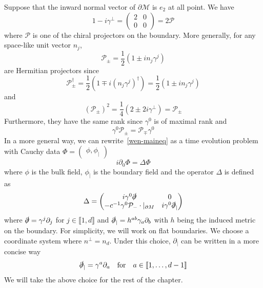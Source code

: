 Suppose that the inward normal vector of $\partial \mathcal{M}$ is $e_2$ at all point.
We have
\begin{equation*}
1 - i\gamma^\bot = 
\begin{pmatrix} 2 & 0 \\ 0 & 0\end{pmatrix} = 2 \mathcal{P}
\end{equation*}
where $\mathcal{P}$ is one of the chiral projectors on the boundary. 
More generally, for any space-like unit vector $n_j$,
\begin{equation*}
\mathcal{P}_\pm = \frac{1}{2}(1 \pm i n_j\gamma^j) 
\end{equation*}
are Hermitian projectors since 
\begin{equation*}
\mathcal{P}_\pm^\dagger = 
\frac{1}{2}(1 \mp i (n_j \gamma^j)^\dagger)=
\frac{1}{2}(1 \pm i n_j \gamma^j)
\end{equation*}
and
\begin{equation*}
(\mathcal{P}_\pm)^{2} = \frac{1}{4}(2\pm 2i \gamma^\bot) = \mathcal{P}_\pm
\end{equation*}
Furthermore, they have the same rank since $\gamma^0$ is of maximal rank and
\begin{equation*}
\gamma^0\mathcal{P}_\pm = \mathcal{P}_\mp\gamma^0
\end{equation*}
In a more general way, 
we can rewrite~\cref{wen-maineq} as a time evolution problem with Cauchy data
$\Phi = \begin{pmatrix}
\phi, \phi_|
\end{pmatrix}$
\begin{equation*}
i\partial_0 \Phi = \Delta \Phi
\end{equation*}
where $\phi$ is the bulk field, $\phi_|$ is the boundary field and the operator $\Delta$ is defined as
\begin{equation}\label{wen-hamiltonian}
\Delta = \begin{pmatrix}
i \gamma^0 \slashed{\partial}  & 0 \\
-c^{-1} \gamma^0 \mathcal{P}_- \cdot \vert_{\partial M}&  i\gamma^0 \slashed{\partial}_|
\end{pmatrix}
\end{equation}
where $\slashed{\partial} = \gamma^j\partial_j$ for
$j \in \llbracket 1 , d \rrbracket$ and $\slashed{\partial}_| = h^{ab} \gamma_{a} \partial_{b}$ with $h$ being the induced metric on the boundary.
For simplicity, we will work on flat boundaries.
We choose a coordinate system where $n^\perp = n_d$.
Under this choice,
$\partial_|$ can be written in a more concise way
\begin{equation*}
\slashed \partial_| = \gamma^a\partial_a \quad\mathrm{for}\quad 
a \in \llbracket 1, \ldots, d-1 \rrbracket
\end{equation*}
We will take the above choice for the rest of the chapter. 





